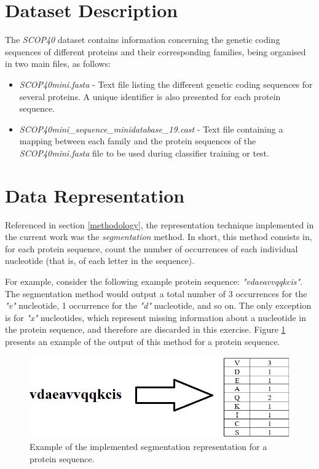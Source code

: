 \documentclass[11pt]{article}
\begin{document}
\section{Dataset Description}
\label{dataset_description}

The \emph{SCOP40} dataset contains information concerning the genetic coding sequences of different proteins and their corresponding families, being organised in two main files, as follows:

\begin{itemize}
	\item \emph{SCOP40mini.fasta} - Text file listing the different genetic coding sequences for several proteins. A unique identifier is also presented for each protein sequence.
	
	\item \emph{SCOP40mini\_sequence\_minidatabase\_19.cast} - Text file containing a mapping between each family and the protein sequences of the \emph{SCOP40mini.fasta} file to be used during classifier training or test.
\end{itemize}

\section{Data Representation}
\label{data_representation}

Referenced in section \ref{methodology}, the representation technique implemented in the current work was the \emph{segmentation} method. In short, this method consists in, for each protein sequence, count the number of occurrences of each individual nucleotide (that is, of each letter in the sequence).

For example, consider the following example protein sequence: \emph{"vdaeavvqqkcis"}. The segmentation method would output a total number of 3 occurrences for the \emph{"v"} nucleotide, 1 occurrence for the \emph{"d"} nucleotide, and so on. The only exception is for \emph{"x"} nucleotides, which represent missing information about a nucleotide in the protein sequence, and therefore are discarded in this exercise. Figure \ref{representation_example} presents an example of the output of this method for a protein sequence. 

\begin{figure}[h]
	\centering
	\includegraphics[scale=0.7]{images/representation.png}
	\caption{Example of the implemented segmentation representation for a protein sequence.}
	\label{representation_example}
\end{figure}
\end{document}
